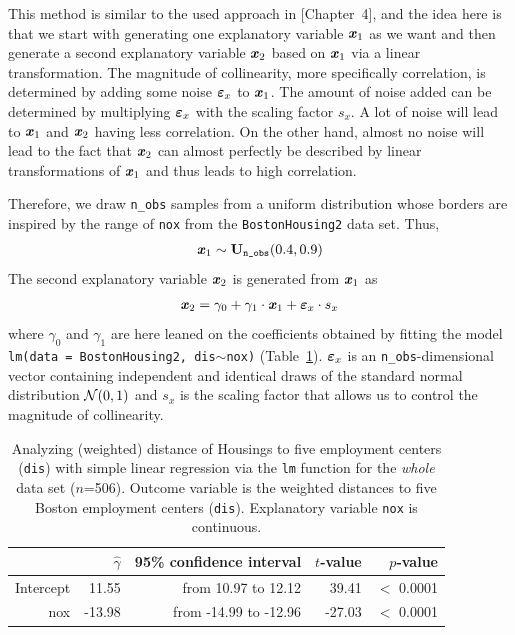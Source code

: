 \documentclass[11pt,a4paper,twoside]{book}\usepackage[]{graphicx}\usepackage[]{xcolor}
\begin{document}
This method is similar to the used approach in \cite{Belsley1991}[Chapter~4], and the idea here is that we start with generating one explanatory variable ${\textbf{\textit{x}}}_1$ as we want and then generate a second explanatory variable ${\textbf{\textit{x}}}_2$ based on ${\textbf{\textit{x}}}_1$ via a linear transformation. The magnitude of collinearity, more specifically correlation, is determined by adding some noise ${\boldsymbol{\varepsilon}}_x$ to ${\textbf{\textit{x}}}_1$. The amount of noise added can be determined by multiplying ${\boldsymbol{\varepsilon}}_x$ with the scaling factor $s_x$. A lot of noise will lead to ${\textbf{\textit{x}}}_1$ and ${\textbf{\textit{x}}}_2$ having less correlation. On the other hand, almost no noise will lead to the fact that ${\textbf{\textit{x}}}_2$ can almost perfectly be described by linear transformations of ${\textbf{\textit{x}}}_1$ and thus leads to high correlation. 

Therefore, we draw \texttt{n\_obs} samples from a uniform distribution whose borders are inspired by the range of \texttt{nox} from the \texttt{BostonHousing2} data set. Thus,
\begin{align}
{\textbf{\textit{x}}}_1\sim {\mathbf{U}}_{\texttt{n\_obs}}(0.4, 0.9)\label{eq:x_nox}
\end{align}
The second explanatory variable ${\textbf{\textit{x}}}_2$ is generated from ${\textbf{\textit{x}}}_1$ as
\begin{align}
{\textbf{\textit{x}}}_2=\gamma_0 + \gamma_1\cdot {\textbf{\textit{x}}}_1 + {\boldsymbol{\varepsilon}}_x\cdot s_x\label{eq:x_dis}
\end{align}
where $\gamma_0$ and $\gamma_1$ are here leaned on the coefficients obtained by fitting the model \texttt{lm(data = BostonHousing2, dis$\sim$nox)} (Table~\ref{tab:bost_exp}). ${\boldsymbol{\varepsilon}}_x$ is an \texttt{n\_obs}-dimensional vector containing independent and identical draws of the standard normal distribution $\operatorname{\mathcal{N}}(0,1)$ and $s_x$ is the scaling factor that allows us to control the magnitude of collinearity. 

\begin{table}[h]
\begin{center}
\caption{Analyzing (weighted) distance of Housings to five employment centers (\texttt{dis}) with simple linear regression via the \texttt{lm} function for the \textit{whole} data set ($n$=506). Outcome variable is the weighted distances to five Boston employment centers (\texttt{dis}). Explanatory variable \texttt{nox} is continuous.}
\label{tab:bost_exp}
\begingroup\footnotesize
\begin{tabular}{rrrrr}
  \hline
 & $\hat\gamma$ & 95\% confidence interval & $t$-value & $p$-value \\ 
  \hline
Intercept & 11.55 & from 10.97 to 12.12 & 39.41 & $<$ 0.0001 \\ 
  nox & -13.98 & from -14.99 to -12.96 & -27.03 & $<$ 0.0001 \\ 
   \hline
\end{tabular}
\endgroup

\end{center}
\end{table}
\end{document}

